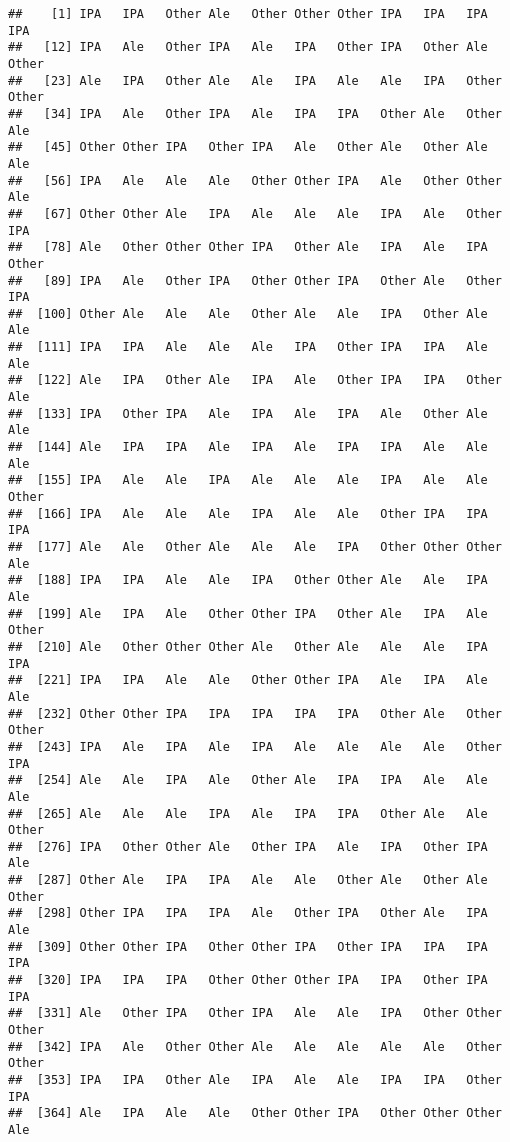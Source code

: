 \documentclass[]{article}
\begin{document}
\begin{verbatim}
##    [1] IPA   IPA   Other Ale   Other Other Other IPA   IPA   IPA   IPA  
##   [12] IPA   Ale   Other IPA   Ale   IPA   Other IPA   Other Ale   Other
##   [23] Ale   IPA   Other Ale   Ale   IPA   Ale   Ale   IPA   Other Other
##   [34] IPA   Ale   Other IPA   Ale   IPA   IPA   Other Ale   Other Ale  
##   [45] Other Other IPA   Other IPA   Ale   Other Ale   Other Ale   Ale  
##   [56] IPA   Ale   Ale   Ale   Other Other IPA   Ale   Other Other Ale  
##   [67] Other Other Ale   IPA   Ale   Ale   Ale   IPA   Ale   Other IPA  
##   [78] Ale   Other Other Other IPA   Other Ale   IPA   Ale   IPA   Other
##   [89] IPA   Ale   Other IPA   Other Other IPA   Other Ale   Other IPA  
##  [100] Other Ale   Ale   Ale   Other Ale   Ale   IPA   Other Ale   Ale  
##  [111] IPA   IPA   Ale   Ale   Ale   IPA   Other IPA   IPA   Ale   Ale  
##  [122] Ale   IPA   Other Ale   IPA   Ale   Other IPA   IPA   Other Ale  
##  [133] IPA   Other IPA   Ale   IPA   Ale   IPA   Ale   Other Ale   Ale  
##  [144] Ale   IPA   IPA   Ale   IPA   Ale   IPA   IPA   Ale   Ale   Ale  
##  [155] IPA   Ale   Ale   IPA   Ale   Ale   Ale   IPA   Ale   Ale   Other
##  [166] IPA   Ale   Ale   Ale   IPA   Ale   Ale   Other IPA   IPA   IPA  
##  [177] Ale   Ale   Other Ale   Ale   Ale   IPA   Other Other Other Ale  
##  [188] IPA   IPA   Ale   Ale   IPA   Other Other Ale   Ale   IPA   Ale  
##  [199] Ale   IPA   Ale   Other Other IPA   Other Ale   IPA   Ale   Other
##  [210] Ale   Other Other Other Ale   Other Ale   Ale   Ale   IPA   IPA  
##  [221] IPA   IPA   Ale   Ale   Other Other IPA   Ale   IPA   Ale   Ale  
##  [232] Other Other IPA   IPA   IPA   IPA   IPA   Other Ale   Other Other
##  [243] IPA   Ale   IPA   Ale   IPA   Ale   Ale   Ale   Ale   Other IPA  
##  [254] Ale   Ale   IPA   Ale   Other Ale   IPA   IPA   Ale   Ale   Ale  
##  [265] Ale   Ale   Ale   IPA   Ale   IPA   IPA   Other Ale   Ale   Other
##  [276] IPA   Other Other Ale   Other IPA   Ale   IPA   Other IPA   Ale  
##  [287] Other Ale   IPA   IPA   Ale   Ale   Other Ale   Other Ale   Other
##  [298] Other IPA   IPA   IPA   Ale   Other IPA   Other Ale   IPA   Ale  
##  [309] Other Other IPA   Other Other IPA   Other IPA   IPA   IPA   IPA  
##  [320] IPA   IPA   IPA   Other Other Other IPA   IPA   Other IPA   IPA  
##  [331] Ale   Other IPA   Other IPA   Ale   Ale   IPA   Other Other Other
##  [342] IPA   Ale   Other Other Ale   Ale   Ale   Ale   Ale   Other Other
##  [353] IPA   IPA   Other Ale   IPA   Ale   Ale   IPA   IPA   Other IPA  
##  [364] Ale   IPA   Ale   Ale   Other Other IPA   Other Other Other Ale  

\end{verbatim}
\end{document}
